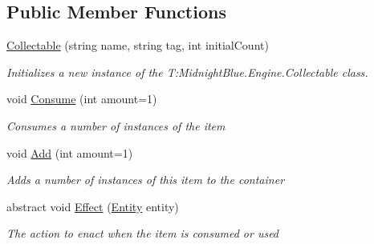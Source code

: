 \subsection*{Public Member Functions}
\begin{DoxyCompactItemize}
\item 
\hyperlink{class_midnight_blue_1_1_engine_1_1_collectable_add10299d380236ae2ba2a0c6fe32a769}{Collectable} (string name, string tag, int initial\+Count)
\begin{DoxyCompactList}\small\item\em Initializes a new instance of the T\+:\+Midnight\+Blue.\+Engine.\+Collectable class. \end{DoxyCompactList}\item 
void \hyperlink{class_midnight_blue_1_1_engine_1_1_collectable_a2563b260d18521524bce996bc153dffb}{Consume} (int amount=1)
\begin{DoxyCompactList}\small\item\em Consumes a number of instances of the item \end{DoxyCompactList}\item 
void \hyperlink{class_midnight_blue_1_1_engine_1_1_collectable_a7c951f1615e5e82c9259893a33ca4b5d}{Add} (int amount=1)
\begin{DoxyCompactList}\small\item\em Adds a number of instances of this item to the container \end{DoxyCompactList}\item 
abstract void \hyperlink{class_midnight_blue_1_1_engine_1_1_collectable_a72a7783ba8fc1bb116193db38a465a6f}{Effect} (\hyperlink{class_midnight_blue_1_1_engine_1_1_entity_component_1_1_entity}{Entity} entity)
\begin{DoxyCompactList}\small\item\em The action to enact when the item is consumed or used \end{DoxyCompactList}\end{DoxyCompactItemize}

